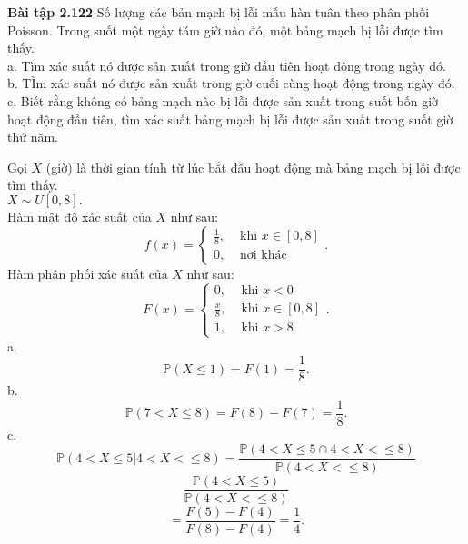 \documentclass[12pt,a4paper]{article}
\begin{document}
\begin{mybox}
\textbf{Bài tập 2.122} Số lượng các bản mạch bị lỗi mấu hàn tuân theo phân phối Poisson. Trong suốt một ngày tám giờ nào đó, một bảng mạch bị lỗi được tìm thấy.\\
a. Tìm xác suất nó được sản xuất trong giờ đầu tiên hoạt động trong ngày đó.\\
b. TÌm xác suất nó được sản xuất trong giờ cuối cùng hoạt động trong ngày đó.\\
c. Biết rằng không có bảng mạch nào bị lỗi được sản xuất trong suốt bốn giờ hoạt động đầu tiên, tìm xác suất bảng mạch bị lỗi được sản xuất trong suốt giờ thứ năm.
\end{mybox}
Gọi $X$ (giờ) là thời gian tính từ lúc bắt đầu hoạt động mà bảng mạch bị lỗi được tìm thấy.\\
$X \sim U \left[ {0, 8} \right].$\\
Hàm mật độ xác suất của $X$ như sau:
$$f \left( x \right) = 
\begin{cases}
	\frac{1}{8}, &\text{ khi } x \in \left[ {0, 8} \right]\\
	0, &\text{ nơi khác}
\end{cases}.
$$
Hàm phân phối xác suất của $X$ như sau:
$$F \left( x \right) = 
\begin{cases}
	0, &\text{ khi } x < 0\\
	\frac{x}{8}, &\text{ khi } x \in \left[ {0, 8} \right]\\
	1, &\text{ khi } x > 8
\end{cases}.
$$
a. $$\mathbb{P} \left( {X \leqslant 1} \right) = F \left( 1 \right) = \frac{1}{8}.$$
b. $$\mathbb{P} \left( {7 < X \leqslant 8} \right) = F \left( 8 \right) - F \left( 7 \right) = \frac{1}{8}.$$
c. $$\mathbb{P} \left( { \left. {4 < X \leqslant 5} \right| {4 < X < \leqslant 8}} \right) = \frac{\mathbb{P} \left( { 4 < X \leqslant 5 \cap 4 < X < \leqslant 8} \right)}{\mathbb{P} \left( {  4 < X < \leqslant 8 } \right)} $$
$$ \frac{\mathbb{P} \left( { 4 < X \leqslant 5} \right)}{\mathbb{P} \left( {  4 < X < \leqslant 8 } \right)} $$
$$= \frac{F \left( 5 \right) - F \left( 4 \right)}{F \left( 8 \right) - F \left( 4 \right)} = \frac{1}{4}.$$
\end{document}
